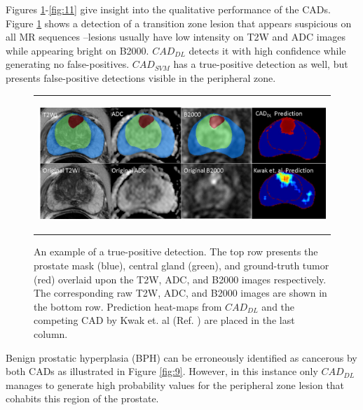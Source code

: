 Figures \ref{fig:8}-\ref{fig:11} give insight into the qualitative performance of the CADs. Figure \ref{fig:8} shows a detection of a transition zone lesion that appears suspicious on all MR sequences --lesions usually have low intensity on T2W and ADC images while appearing bright on B2000. $CAD_{DL}$ detects it with high confidence while generating no false-positives. $CAD_{SVM}$ has a true-positive detection as well, but presents false-positive detections visible in the peripheral zone. 
\begin{figure} [ht]
   \begin{center}
   \begin{tabular}{c}
   \includegraphics[height=5cm]{Figure8}
   \end{tabular}
   \end{center}
   \caption[Fig8]
   { \label{fig:8} 
An example of a true-positive detection. The top row presents the prostate mask (blue), central gland (green), and ground-truth tumor (red) overlaid upon the T2W, ADC, and B2000 images respectively. The corresponding raw T2W, ADC, and B2000 images are shown in the bottom row. Prediction heat-maps from $CAD_{DL}$ and the competing CAD by Kwak et. al (Ref. ) are placed in the last column.}
   \end{figure}
Benign prostatic hyperplasia (BPH) can be erroneously identified as cancerous by both CADs as illustrated in Figure \ref{fig:9}. However, in this instance only $CAD_{DL}$ manages to generate high probability values for the peripheral zone lesion that cohabits this region of the prostate. 
